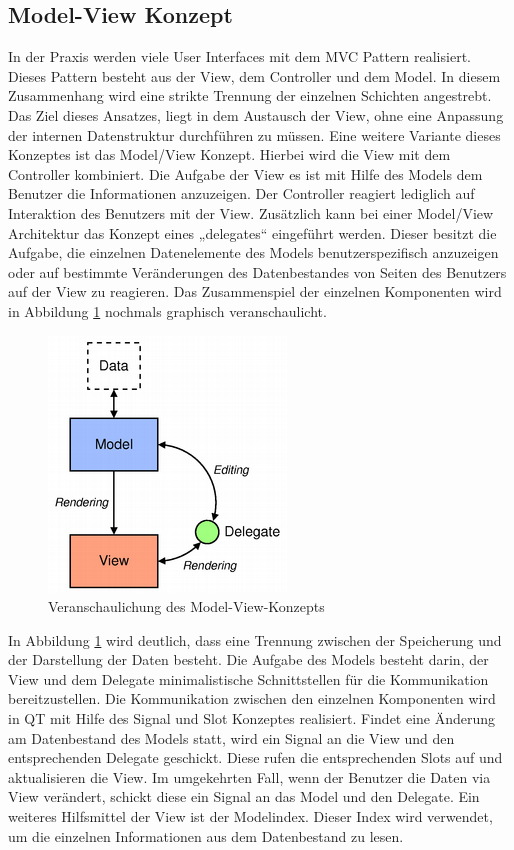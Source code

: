 \cite{vorteileQt1} \cite{vorteileQt2} \cite{vorteileQt3}

\subsection{Model-View Konzept}

In der Praxis werden viele User Interfaces mit dem MVC Pattern realisiert. Dieses Pattern besteht aus der View, dem Controller und dem Model. In diesem Zusammenhang wird eine strikte Trennung der einzelnen Schichten angestrebt. Das Ziel dieses Ansatzes, liegt in dem Austausch der View, ohne eine Anpassung der internen Datenstruktur durchführen zu müssen. Eine weitere Variante dieses Konzeptes ist das Model/View Konzept. Hierbei wird die View mit dem Controller kombiniert. Die Aufgabe der View es ist mit Hilfe des Models dem Benutzer die Informationen anzuzeigen. Der Controller reagiert lediglich auf Interaktion des Benutzers mit der View. Zusätzlich kann bei einer Model/View Architektur das Konzept eines „delegates“ eingeführt werden. Dieser besitzt die Aufgabe, die einzelnen Datenelemente des Models benutzerspezifisch anzuzeigen oder auf bestimmte Veränderungen des Datenbestandes von Seiten des Benutzers auf der View zu reagieren. Das Zusammenspiel der einzelnen Komponenten wird in Abbildung \ref{pic:ModelView} nochmals graphisch veranschaulicht.

\begin{figure}[H]
	\centering
	\includegraphics[scale=1.0]{images/ModelView.png}
	\caption{Veranschaulichung des Model-View-Konzepts}
	\label{pic:ModelView}
\end{figure}

In Abbildung \ref{pic:ModelView} wird deutlich, dass eine Trennung zwischen der Speicherung und der Darstellung der Daten besteht. Die Aufgabe des Models besteht darin, der View und dem Delegate minimalistische Schnittstellen für die Kommunikation bereitzustellen. Die Kommunikation zwischen den einzelnen Komponenten wird in QT mit Hilfe des Signal und Slot Konzeptes realisiert. Findet eine Änderung am Datenbestand des Models statt, wird ein Signal an die View und den entsprechenden Delegate geschickt. Diese rufen die entsprechenden Slots auf und aktualisieren die View. Im umgekehrten Fall, wenn der Benutzer die Daten via View verändert, schickt diese ein Signal an das Model und den Delegate. Ein weiteres Hilfsmittel der View ist der Modelindex. Dieser Index wird verwendet, um die einzelnen Informationen aus dem Datenbestand zu lesen. \\

